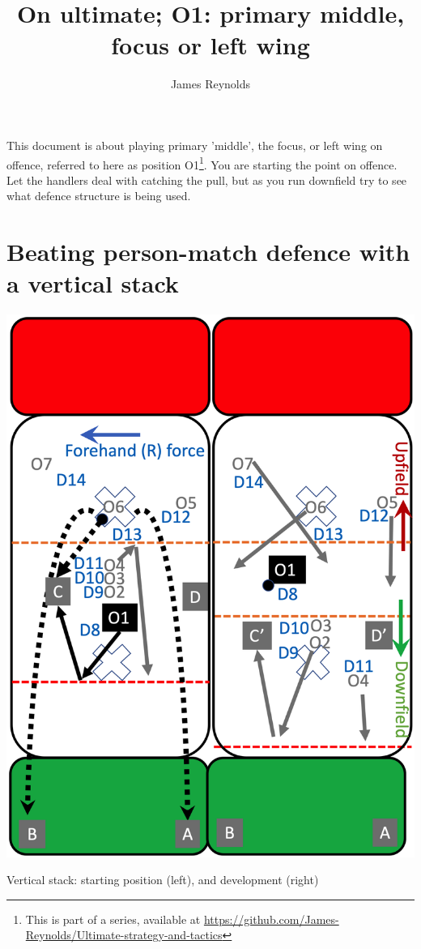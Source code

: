 \documentclass{tufte-handout}
\title{On ultimate; O1: primary middle, focus or left wing}
\author[James Reynolds]{James Reynolds}
\begin{document}
\maketitle%



This document is about 
playing primary 'middle', 
the focus, 
or left wing 
on offence,
referred to here 
as position O1\footnote{This
is part of a series, 
available at
\url{https://github.com/James-Reynolds/Ultimate-strategy-and-tactics}}.
You are starting the point on offence. 
Let the handlers 
deal with catching the pull, but
as you run downfield
try to 
see
what defence structure
is being used. 

\section{Beating person-match defence with a vertical stack}\label{sec:vertical}

\begin{marginfigure}%
  \includegraphics[width=\linewidth]{O1-vertical}
  \caption{Vertical stack: 
  starting position (left),
  and development (right)}
  \label{fig:O1-vertical}
\end{marginfigure}
\end{document}
